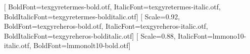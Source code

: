 
\usepackage[margin=0.95in]{geometry}
\ifPDFTeX
  \usepackage{newtxtext,newtxmath}
\else
  \setmainfont{texgyretermes-regular.otf}[
    BoldFont=texgyretermes-bold.otf,
    ItalicFont=texgyretermes-italic.otf,
    BoldItalicFont=texgyretermes-bolditalic.otf]
  \setsansfont{texgyreheros-regular.otf}[
    Scale=0.92,
    BoldFont=texgyreheros-bold.otf,
    ItalicFont=texgyreheros-italic.otf,
    BoldItalicFont=texgyreheros-bolditalic.otf]
  \setmonofont{lmmono10-regular.otf}[
    Scale=0.88,
    ItalicFont=lmmono10-italic.otf,
    BoldFont=lmmonolt10-bold.otf]
\fi
\usepackage{etoolbox}
\usepackage{fvextra}
\usepackage{xurl}
\usepackage[htt]{hyphenat}
\usepackage{float}
\renewcommand{\topfraction}{0.92}
\renewcommand{\bottomfraction}{0.85}
\renewcommand{\textfraction}{0.07}
\renewcommand{\floatpagefraction}{0.85}
\setlength{\emergencystretch}{3em}
\usepackage{caption}
\captionsetup{font=small,labelfont=bf}

